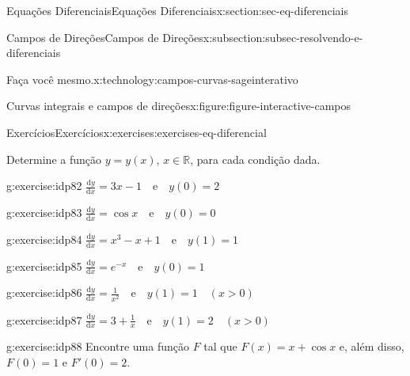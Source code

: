 \documentclass[oneside,10pt,]{article}
\numberwithin{equation}{section}
\newlength{\qrsize}
\newlength{\previewwidth}
\newcommand{\dd}{\mathrm{d}}
\begin{document}
\begin{sectionptx}{Equações Diferenciais}{}{Equações Diferenciais}{}{}{x:section:sec-eq-diferenciais}
\begin{subsectionptx}{Campos de Direções}{}{Campos de Direções}{}{}{x:subsection:subsec-resolvendo-e-diferenciais}
\begin{technology}{Faça você mesmo.}{x:technology:campos-curvas-sageinterativo}
\begin{figureptx}{Curvas integrais e campos de direções}{x:figure:figure-interactive-campos}{}
\begin{tcbraster}[raster columns=2, raster column skip=1pt, raster halign=center, raster force size=false, raster left skip=0pt, raster right skip=0pt]
\begin{tcolorbox}[previewstyle, width=\previewwidth]
\end{tcolorbox}%
\begin{tcolorbox}[qrstyle]%
{\hypersetup{urlcolor=black}}%
\end{tcolorbox}%
\end{tcbraster}%
\tcblower
\end{figureptx}%
\end{technology}
\end{subsectionptx}
%
%
\typeout{************************************************}
\typeout{************************************************}
%
\begin{exercises-subsection}{Exercícios}{}{Exercícios}{}{}{x:exercises:exercises-eq-diferencial}
\par\medskip\noindent%
%
Determine a função \(y=y(x)\), \(x\in\mathbb{R}\), para cada condição dada.%
\begin{exercisegroup}
\begin{divisionexerciseeg}{1}{}{}{g:exercise:idp82}%
\(\frac{\dd y}{\dd x}=3x-1\quad \text{e} \quad y(0)=2\)\end{divisionexerciseeg}%
\begin{divisionexerciseeg}{2}{}{}{g:exercise:idp83}%
\(\frac{\dd y}{\dd x}=\cos{x} \quad \text{e} \quad y(0)=0\)\end{divisionexerciseeg}%
\begin{divisionexerciseeg}{3}{}{}{g:exercise:idp84}%
\(\frac{\dd y}{\dd x}=x^3-x+1 \quad \text{e}\quad  y(1)=1\)\end{divisionexerciseeg}%
\begin{divisionexerciseeg}{4}{}{}{g:exercise:idp85}%
\(\frac{\dd y}{\dd x}=e^{-x} \quad \text{e}\quad  y(0)=1\)\end{divisionexerciseeg}%
\begin{divisionexerciseeg}{5}{}{}{g:exercise:idp86}%
\(\frac{\dd y}{\dd x}=\frac{1}{x^2}\quad  \text{e}\quad  y(1)=1\quad (x>0)\)\end{divisionexerciseeg}%
\begin{divisionexerciseeg}{6}{}{}{g:exercise:idp87}%
\(\frac{\dd y}{\dd x}=3 + \frac{1}{x}\quad  \text{e}\quad  y(1)=2\quad(x>0)\)\end{divisionexerciseeg}%
\end{exercisegroup}
\par\medskip\noindent
\begin{divisionexercise}{7}{}{}{g:exercise:idp88}%
Encontre uma função \(F\) tal que \(F(x) = x + \cos{x}\) e, além disso, \(F (0) = 1\) e \(F'(0) = 2\).%

\end{divisionexercise}
\end{exercises-subsection}
\end{sectionptx}
\end{document}
